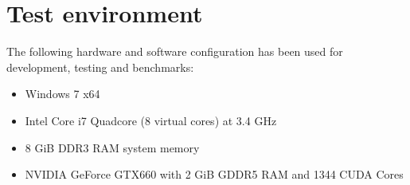 \chapter{Test environment}
\label{sec:test_environment}

The following hardware and software configuration has been used for development, testing and benchmarks:

\begin{itemize}
	\item Windows 7 x64
	\item Intel Core i7 Quadcore (8 virtual cores) at 3.4 GHz
	\item 8 GiB DDR3 RAM system memory
	\item NVIDIA GeForce GTX660 with 2 GiB GDDR5 RAM and 1344 CUDA Cores
\end{itemize}

